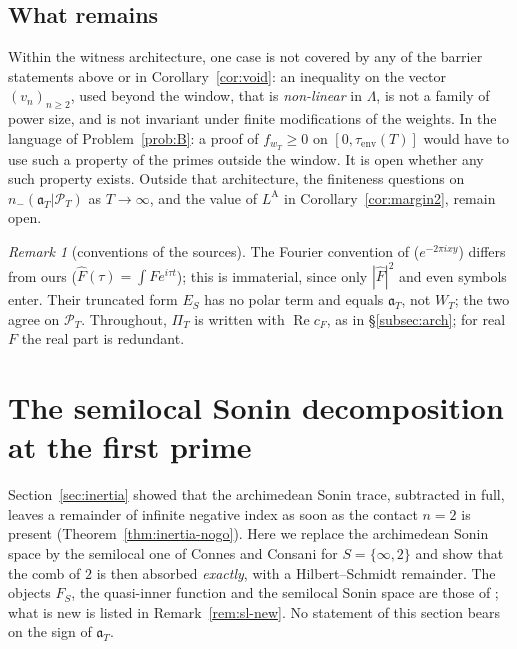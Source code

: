 \documentclass[11pt]{amsart}
\theoremstyle{definition}
\theoremstyle{remark}
\newtheorem{remark}[theorem]{Remark}
\newcommand{\Rel}{\operatorname{Re}}
\newcommand{\PT}{\mathcal P_T}
\newcommand{\Fh}{\widehat F}
\newcommand{\cF}{c_F}
\newcommand{\PiT}{\Pi_T}
\begin{document}
\subsection{What remains}
Within the witness architecture, one case is not covered by any of the barrier statements above or in
Corollary~\ref{cor:void}: an inequality on the vector $(v_n)_{n\ge2}$, used beyond the window, that is
\emph{non-linear} in $\Lambda$, is not a family of power size, and is not invariant under finite modifications of
the weights. In the language of Problem~\ref{prob:B}: a proof of $f_{w_T}\ge0$ on
$[0,\tau_{\mathrm{env}}(T)]$ would have to use such a property of the primes outside the window. It is open
whether any such property exists. Outside that architecture, the finiteness questions on $n_-(\mathfrak a_T|\PT)$
as $T\to\infty$, and the value of $L^{\mathrm A}$ in Corollary~\ref{cor:margin2}, remain open.

\begin{remark}[conventions of the sources]\label{rem:inertia-conv}
The Fourier convention of \cite{ConnesConsani2021} ($e^{-2\pi ixy}$) differs from ours ($\Fh(\tau)=\int Fe^{i\tau t}$);
this is immaterial, since only $|\Fh|^2$ and even symbols enter. Their truncated form $E_S$ has no polar term and
equals $\mathfrak a_T$, not $W_T$; the two agree on $\PT$. Throughout, $\PiT$ is written with $\Rel\cF$, as in
\S\ref{subsec:arch}; for real $F$ the real part is redundant.
\end{remark}

\section{The semilocal Sonin decomposition at the first prime}\label{sec:semilocal}

Section~\ref{sec:inertia} showed that the archimedean Sonin trace, subtracted in full, leaves a
remainder of infinite negative index as soon as the contact $n=2$ is present
(Theorem~\ref{thm:inertia-nogo}). Here we replace the archimedean Sonin space by the semilocal one of
Connes and Consani for $S=\{\infty,2\}$ and show that the comb of $2$ is then absorbed \emph{exactly},
with a Hilbert--Schmidt remainder. The objects $F_S$, the quasi-inner function and the semilocal Sonin
space are those of \cite{CCquasi2020,CCM2023}; what is new is listed in Remark~\ref{rem:sl-new}. No
statement of this section bears on the sign of $\mathfrak a_T$.
\end{document}
